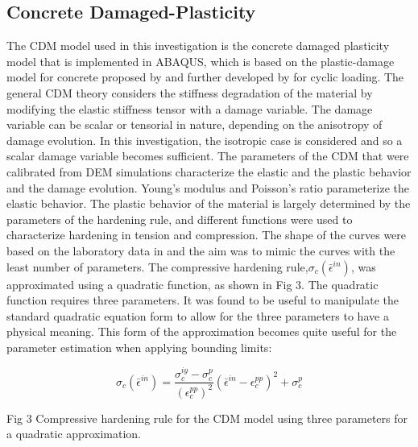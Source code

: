 \subsection{Concrete Damaged-Plasticity}

The CDM model used in this investigation is the concrete damaged plasticity
model that is implemented in ABAQUS, which is based on the plastic-damage
model for concrete proposed by \citet{lubliner_plastic-damage_1989} and further
developed by \citet{lee_plastic-damage_1998} for cyclic loading. The general
CDM theory considers the stiffness degradation of the material by
modifying the elastic stiffness tensor with a damage variable. The
damage variable can be scalar or tensorial in nature, depending on
the anisotropy of damage evolution. In this investigation, the isotropic
case is considered and so a scalar damage variable becomes sufficient.
The parameters of the CDM that were calibrated from DEM simulations
characterize the elastic and the plastic behavior and the damage evolution.
Young's modulus and Poisson's ratio parameterize the elastic behavior.
The plastic behavior of the material is largely determined by the
parameters of the hardening rule, and different functions were used
to characterize hardening in tension and compression. The shape of
the curves were based on the laboratory data in \citet{wahalathantri_material_2011} and the aim was to mimic the curves with the least number of
parameters. The compressive hardening rule,$\sigma_{c}\left(\bar{\epsilon}^{in}\right)$,
was approximated using a quadratic function, as shown in Fig 3. The
quadratic function requires three parameters. It was found to be useful
to manipulate the standard quadratic equation form to allow for the
three parameters to have a physical meaning. This form of the approximation
becomes quite useful for the parameter estimation when applying bounding
limits:

\begin{equation}
\sigma_{c}\left(\bar{\epsilon}^{in}\right)=\frac{\sigma_{c}^{iy}-\sigma_{c}^{p}}{\left(\epsilon_{c}^{pp}\right)^{2}}\left(\bar{\epsilon}^{in}-\epsilon_{c}^{pp}\right)^{2}+\sigma_{c}^{p}\label{eqn:param2-1}
\end{equation}


Fig 3 Compressive hardening rule for the CDM model using three parameters
for a quadratic approximation.

